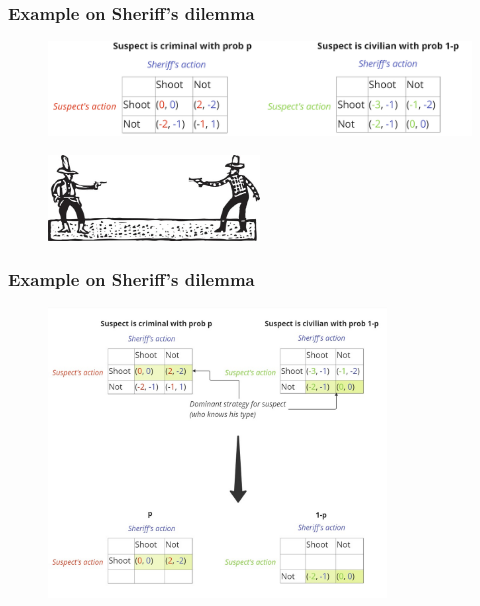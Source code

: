 \documentclass[11pt]{beamer}
\begin{document}
\begin{frame}
    \frametitle{Example on Sheriff's dilemma}

    \vspace{10mm}
    
    \begin{figure}
        \centering
        \includegraphics[width=1.0\textwidth]{assets/sheriff.png}
    \end{figure}

    \vspace{20mm}
    
    \begin{figure}
        \centering
        \includegraphics[width=0.5\textwidth]{assets/gunfight.jpg}
    \end{figure}
    
\end{frame} 


\begin{frame}
    \frametitle{Example on Sheriff's dilemma}

    
    \begin{figure}
        \centering
        \includegraphics[width=0.8\textwidth]{assets/sheriff2.jpg}
    \end{figure}

    \vspace{5mm}
    
\end{frame} 
\end{document}
